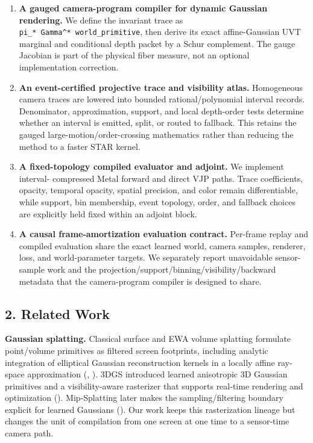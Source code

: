 \documentclass[
]{article}
\begin{document}
\begin{enumerate}
\def\labelenumi{\arabic{enumi}.}
\item
  \textbf{A gauged camera-program compiler for dynamic Gaussian
  rendering.} We define the invariant trace as
  \texttt{pi\_*\ Gamma\^{}*\ world\_primitive}, then derive its exact
  affine-Gaussian UVT marginal and conditional depth packet by a Schur
  complement. The gauge Jacobian is part of the physical fiber measure,
  not an optional implementation correction.
\item
  \textbf{An event-certified projective trace and visibility atlas.}
  Homogeneous camera traces are lowered into bounded rational/polynomial
  interval records. Denominator, approximation, support, and local
  depth-order tests determine whether an interval is emitted, split, or
  routed to fallback. This retains the gauged
  large-motion/order-crossing mathematics rather than reducing the
  method to a faster STAR kernel.
\item
  \textbf{A fixed-topology compiled evaluator and adjoint.} We implement
  interval- compressed Metal forward and direct VJP paths. Trace
  coefficients, opacity, temporal opacity, spatial precision, and color
  remain differentiable, while support, bin membership, event topology,
  order, and fallback choices are explicitly held fixed within an
  adjoint block.
\item
  \textbf{A causal frame-amortization evaluation contract.} Per-frame
  replay and compiled evaluation share the exact learned world, camera
  samples, renderer, loss, and world-parameter targets. We separately
  report unavoidable sensor-sample work and the
  projection/support/binning/visibility/backward metadata that the
  camera-program compiler is designed to share.
\end{enumerate}

\subsection{2. Related Work}\label{related-work}

\textbf{Gaussian splatting.} Classical surface and EWA volume splatting
formulate point/volume primitives as filtered screen footprints,
including analytic integration of elliptical Gaussian reconstruction
kernels in a locally affine ray-space approximation
(,
). 3DGS introduced learned
anisotropic 3D Gaussian primitives and a visibility-aware rasterizer
that supports real-time rendering and optimization
(). Mip-Splatting later makes
the sampling/filtering boundary explicit for learned Gaussians
(). Our work keeps
this rasterization lineage but changes the unit of compilation from one
screen at one time to a sensor-time camera path.
\end{document}
